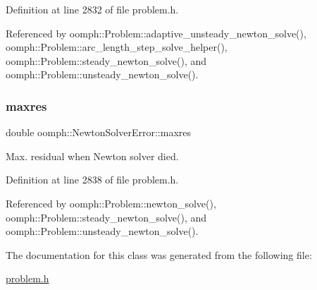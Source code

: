 Definition at line 2832 of file problem.\+h.



Referenced by oomph\+::\+Problem\+::adaptive\+\_\+unsteady\+\_\+newton\+\_\+solve(), oomph\+::\+Problem\+::arc\+\_\+length\+\_\+step\+\_\+solve\+\_\+helper(), oomph\+::\+Problem\+::steady\+\_\+newton\+\_\+solve(), and oomph\+::\+Problem\+::unsteady\+\_\+newton\+\_\+solve().

\mbox{\label{classoomph_1_1NewtonSolverError_ae9ee0ef969c2fbf869afb7c4a75dcbe0}} 
\subsubsection{\texorpdfstring{maxres}{maxres}}
{\footnotesize\ttfamily double oomph\+::\+Newton\+Solver\+Error\+::maxres}



Max. residual when Newton solver died. 



Definition at line 2838 of file problem.\+h.



Referenced by oomph\+::\+Problem\+::newton\+\_\+solve(), oomph\+::\+Problem\+::steady\+\_\+newton\+\_\+solve(), and oomph\+::\+Problem\+::unsteady\+\_\+newton\+\_\+solve().



The documentation for this class was generated from the following file\+:\begin{DoxyCompactItemize}
\item 
\hyperlink{problem_8h}{problem.\+h}\end{DoxyCompactItemize}
